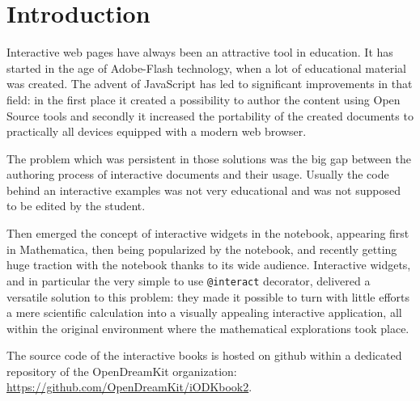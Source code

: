 \documentclass{deliverablereport}
\author{Marcin Kostur, Jerzy Łuczka, Jan Aksamit, Jolanta Marzec}
\begin{document}
\maketitle

\tableofcontents

\section{Introduction}

Interactive web pages have always been an attractive tool in
education. It has started in the age of Adobe-Flash technology, when a
lot of educational material was created. The advent of JavaScript has
led to significant improvements in that field: in the first place it
created a possibility to author the content using Open Source tools
and secondly it increased the portability of the created documents to
practically all devices equipped with a modern web browser.

The problem which was persistent in those solutions was the big gap
between the authoring process of interactive documents and their usage.
Usually the code behind an interactive examples was not very
educational and was not supposed to be edited by the student.

Then emerged the concept of interactive widgets in the notebook,
appearing first in Mathematica, then being popularized by the \Sage
notebook, and recently getting huge traction with the \Jupyter
notebook thanks to its wide audience. Interactive widgets, and in
particular the very simple to use \texttt{@interact} decorator,
delivered a versatile solution to this problem: they made it possible
to turn with little efforts a mere scientific calculation into a
visually appealing interactive application, all within the original
environment where the mathematical explorations took place.


The source code of the interactive books is hosted on github within a
dedicated repository of the OpenDreamKit organization:
\url{https://github.com/OpenDreamKit/iODKbook2}.
\end{document}
